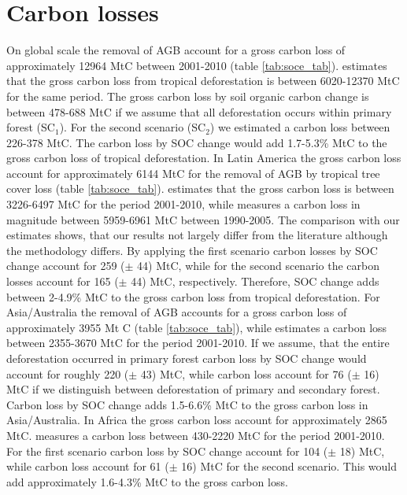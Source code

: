 	\section{Carbon losses}
		On global scale the removal of \ac{AGB} account for a gross carbon loss of approximately 12964 MtC between 2001-2010 (table \ref{tab:soce_tab}). \citet{Achard2014} estimates that the gross carbon loss from tropical deforestation is between 6020-12370 MtC for the same period. The gross carbon loss by soil organic carbon change is between 478-688 MtC if we assume that all deforestation occurs within primary forest (SC$_1$). For the second scenario (SC$_2$) we estimated a carbon loss between 226-378 MtC. The carbon loss by \ac{SOC} change would add 1.7-5.3\% MtC to the gross carbon loss of tropical deforestation. In Latin America the gross carbon loss account for approximately 6144 MtC for the removal of \ac{AGB} by tropical tree cover loss (table \ref{tab:soce_tab}). \citet{Achard2014} estimates that the gross carbon loss is between 3226-6497 MtC for the period 2001-2010, while \citet{Sy2015} measures a carbon loss in magnitude between 5959-6961 MtC between 1990-2005. The comparison with our estimates shows, that our results not largely differ from the literature although the methodology differs. By applying the first scenario carbon losses by \ac{SOC} change account for 259 ($\pm$ 44) MtC, while for the second scenario the carbon losses account for 165 ($\pm$ 44) MtC, respectively. Therefore, \ac{SOC} change adds between 2-4.9\% MtC to the gross carbon loss from tropical deforestation. For Asia/Australia the removal of \ac{AGB} accounts for a gross carbon loss of approximately 3955 Mt C (table \ref{tab:soce_tab}), while \citep{Achard2014} estimates a carbon loss between 2355-3670 MtC for the period 2001-2010. If we assume, that the entire deforestation occurred in primary forest carbon loss by \ac{SOC} change would account for roughly 220 ($\pm$ 43) MtC, while carbon loss account for 76 ($\pm$ 16) MtC if we distinguish between deforestation of primary and secondary forest. Carbon loss by \ac{SOC} change adds 1.5-6.6\% MtC to the gross carbon loss in Asia/Australia. In Africa the gross carbon loss account for approximately 2865 MtC. \citep{Achard2014} measures a carbon loss between 430-2220 MtC for the period 2001-2010. For the first scenario carbon loss by \ac{SOC} change account for 104 ($\pm$ 18) MtC, while carbon loss account for 61 ($\pm$ 16) MtC for the second scenario. This would add approximately 1.6-4.3\% MtC to the gross carbon loss.
